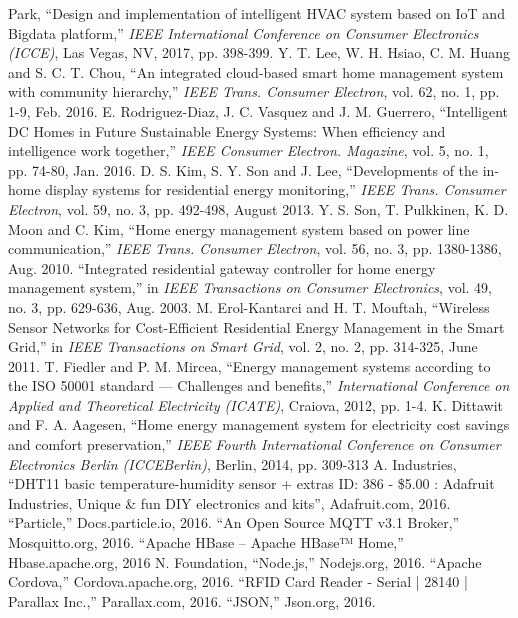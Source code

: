 \documentclass[a4paper,12pt,oneside]{article}
\begin{document}
\begin{thebibliography}{9}
Park, “Design and implementation of intelligent HVAC system based on
IoT and Bigdata platform,” \emph{IEEE International Conference on
Consumer Electronics (ICCE)}, Las Vegas, NV, 2017, pp. 398-399.
Y. T. Lee, W. H. Hsiao, C. M. Huang and S. C. T. Chou, “An integrated
cloud-based smart home management system with community
hierarchy,”\emph{ IEEE Trans. Consumer Electron}, vol. 62, no. 1, pp. 1-9, Feb.
2016.
E. Rodriguez-Diaz, J. C. Vasquez and J. M. Guerrero, “Intelligent DC
Homes in Future Sustainable Energy Systems: When efficiency and
intelligence work together,”\emph{ IEEE Consumer Electron. Magazine}, vol. 5,
no. 1, pp. 74-80, Jan. 2016.
D. S. Kim, S. Y. Son and J. Lee, “Developments of the in-home display
systems for residential energy monitoring,” \emph{IEEE Trans. Consumer
Electron}, vol. 59, no. 3, pp. 492-498, August 2013.
Y. S. Son, T. Pulkkinen, K. D. Moon and C. Kim, “Home energy
management system based on power line communication,” \emph{IEEE Trans.
Consumer Electron}, vol. 56, no. 3, pp. 1380-1386, Aug. 2010.
“Integrated residential gateway controller for home energy management
system,” in \emph{IEEE Transactions on Consumer Electronics}, vol. 49, no. 3,
pp. 629-636, Aug. 2003.
M. Erol-Kantarci and H. T. Mouftah, “Wireless Sensor Networks for
Cost-Efficient Residential Energy Management in the Smart Grid,” in
\emph{IEEE Transactions on Smart Grid}, vol. 2, no. 2, pp. 314-325, June 2011.
T. Fiedler and P. M. Mircea, “Energy management systems according to
the ISO 50001 standard — Challenges and benefits,” \emph{ International
Conference on Applied and Theoretical Electricity (ICATE)}, Craiova,
2012, pp. 1-4.
K. Dittawit and F. A. Aagesen, “Home energy management system for
electricity cost savings and comfort preservation,” \emph{ IEEE Fourth
International Conference on Consumer Electronics Berlin (ICCEBerlin)},
Berlin, 2014, pp. 309-313
A. Industries, “DHT11 basic temperature-humidity sensor + extras ID:
386 - \$5.00 : Adafruit Industries, Unique \& fun DIY electronics and
kits”, Adafruit.com, 2016.
“Particle,” Docs.particle.io, 2016.
“An Open Source MQTT v3.1 Broker,” Mosquitto.org, 2016.
“Apache HBase – Apache HBase™ Home,” Hbase.apache.org, 2016
N. Foundation, “Node.js,” Nodejs.org, 2016.
“Apache Cordova,” Cordova.apache.org, 2016.
“RFID Card Reader - Serial | 28140 | Parallax Inc.,” Parallax.com, 2016.
“JSON,” Json.org, 2016.

\end{thebibliography}
\end{document}
